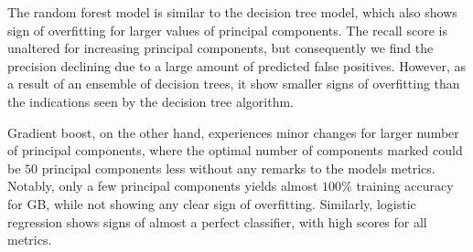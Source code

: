 The random forest model is similar to the decision tree model, which also shows sign of overfitting for larger values of principal components. The recall score is unaltered for increasing principal components, but consequently we find the precision declining due to a large amount of predicted false positives.  However, as a result of an ensemble of decision trees, it show smaller signs of overfitting than the indications seen by the decision tree algorithm.

Gradient boost, on the other hand, experiences minor changes for larger number of principal components, where the optimal number of components marked could be $50$ principal components less without any remarks to the models metrics. Notably, only a few principal components yields almost $100\%$ training accuracy for GB, while not showing any clear sign of overfitting. Similarly, logistic regression shows signs of almost a perfect classifier, with high scores for all metrics.

\clearpage

